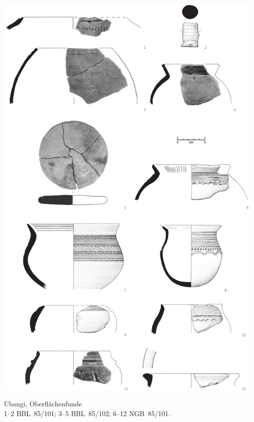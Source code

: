 \begin{pl}[H]
	\includegraphics{plt/Taf6.pdf}
	\vspace{.75em}\caption{\mbox{Ubangi}, Oberflächenfunde \\ 1--2 BBL~85/101; 3--5 BBL~85/102; 6--12 NGB~85/101.}
	\label{pl:6}
\end{pl}

